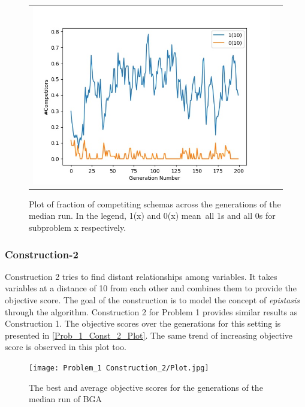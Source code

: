 \documentclass{article}
\begin{document}
\begin{figure}[H]
\begin{adjustbox}{width=0.6\paperwidth}
\begin{tabular}{c c}
				\includegraphics{Codes/Problem_1 Construction_1/Comp_10.jpg}\\
			\end{tabular}
		\end{adjustbox}
		\caption{Plot of fraction of competiting schemas across the generations of the median run. In the legend, 1(x) and 0(x) mean\ all 1s and all 0s for subproblem x respectively.}
		\label{Prob_1_Const_1_Comp_Plot}
	\end{figure}

	\subsubsection{Construction-2}
	
	Construction 2 tries to find distant relationships among variables. It takes variables at a distance of 10 from each other and combines them to provide the objective score. The goal of the construction is to model the concept of \textit{epistasis} through the algorithm.
	Construction 2 for Problem 1 provides similar results as Construction 1. The objective scores over the generations for this setting is presented in \autoref{Prob_1_Const_2_Plot}. The same trend of increasing objective score is observed in this plot too.
	
	\begin{figure}[H]
		\centering
		\texttt{[image: Problem\_1 Construction\_2/Plot.jpg]}
		\caption{The best and average objective scores for the generations of the median run of BGA}
		\label{Prob_1_Const_2_Plot}
	\end{figure}    
	
\end{document}
